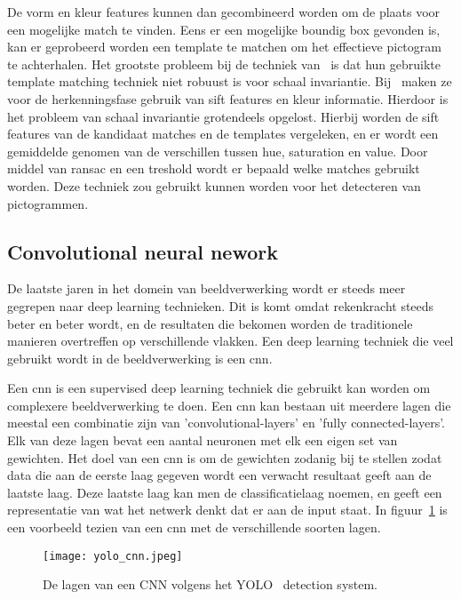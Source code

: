             De vorm en kleur features kunnen dan gecombineerd worden om de plaats voor een mogelijke match te vinden. Eens er een mogelijke boundig box gevonden is,
            kan er geprobeerd worden een template te matchen om het effectieve pictogram te achterhalen. Het grootste probleem bij de techniek van~\cite{Fang2003} is
            dat hun gebruikte template matching techniek niet robuust is voor schaal invariantie.
            Bij~\cite{Zabihi2017} maken ze voor de herkenningsfase gebruik van \gls{sift}\cite{Lowe1999} features en kleur informatie.
            Hierdoor is het probleem van schaal invariantie grotendeels opgelost.
            Hierbij worden de \gls{sift} features van de kandidaat matches en de templates vergeleken, en er wordt een gemiddelde genomen van de verschillen tussen hue, saturation en value.
            Door middel van \gls{ransac} en een treshold wordt er bepaald welke matches gebruikt worden. Deze techniek zou gebruikt kunnen worden voor het detecteren van pictogrammen.

        
        \subsection{Convolutional neural nework} \label{sec:yolo}
            De laatste jaren in het domein van beeldverwerking wordt er steeds meer gegrepen naar deep learning technieken. Dit is komt omdat rekenkracht steeds beter en beter wordt, en de resultaten die bekomen worden
            de traditionele manieren overtreffen op verschillende vlakken. Een deep learning techniek die veel gebruikt wordt in de beeldverwerking is een \gls{cnn}.

            Een \gls{cnn} is een supervised deep learning techniek die gebruikt kan worden om complexere beeldverwerking te doen.
            Een \gls{cnn} kan bestaan uit meerdere lagen die meestal een combinatie zijn van 'convolutional-layers' en 'fully connected-layers'. Elk van deze lagen bevat een aantal neuronen met elk een eigen set van gewichten.
            Het doel van een \gls{cnn} is om de gewichten zodanig bij te stellen zodat data die aan de eerste laag gegeven wordt een verwacht resultaat geeft aan de laatste laag. 
            Deze laatste laag kan men de classificatielaag noemen, en geeft een representatie van wat het netwerk denkt dat er aan de input staat. In figuur~\ref{fig:yolo_cnn} is een voorbeeld tezien van een \gls{cnn} met de verschillende soorten lagen.

            \begin{figure}[!htb]
                \centering
                \texttt{[image: yolo\_cnn.jpeg]}
                \caption{De lagen van een CNN volgens het YOLO~\cite{Redmon_2016} detection system.}
                \label{fig:yolo_cnn}
            \end{figure}

